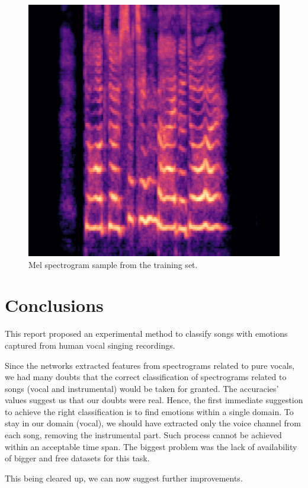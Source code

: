 \documentclass[10pt,twocolumn,letterpaper]{article}
\begin{document}
      \begin{figure}[ht]
         \begin{center}
         \includegraphics[width=0.8\linewidth]{img/mel-spectrogram.png}
         \end{center}
            \caption{Mel spectrogram sample from the training set.}
         \label{fig:mel-sample}
         \end{figure}

\section{Conclusions}\label{conclusions}

This report proposed an experimental method to classify songs with emotions captured from human vocal singing recordings.

Since the networks extracted features from spectrograms related to pure vocals, we had many doubts that the correct classification of spectrograms related to songs (vocal and instrumental) would be taken for granted. The accuracies' values suggest us that our doubts were real. Hence, the first immediate suggestion to achieve the right classification is to find emotions within a single domain. To stay in our domain (vocal), we should have extracted only the voice channel from each song, removing the instrumental part. Such process cannot be achieved within an acceptable time span. The biggest problem was the lack of availability of bigger and free datasets for this task.

This being cleared up, we can now suggest further improvements.
\end{document}
